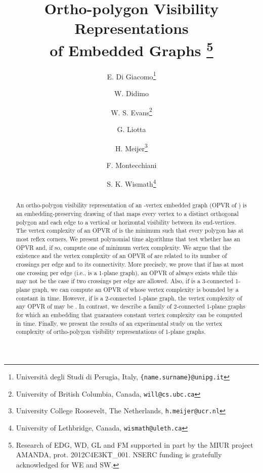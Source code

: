 \documentclass{article}
\newcommand{\opvr}{OPVR\xspace}
\begin{document}
\title{Ortho-polygon Visibility Representations\\of Embedded Graphs
\thanks{Research of EDG, WD, GL and FM  supported in part by the MIUR project AMANDA, prot. 2012C4E3KT\_001. NSERC funding is gratefully acknowledged for WE and SW.}}




\author{E. Di Giacomo\thanks{Universit{\`a} degli Studi di Perugia, Italy, \texttt{\{name.surname\}@unipg.it}} \and W. Didimo\footnotemark[1] \and W. S. Evans\thanks{University of British Columbia, Canada, \texttt{will@cs.ubc.ca}} \and G. Liotta\footnotemark[1] \and H. Meijer\thanks{University College Roosevelt, The Netherlands, \texttt{h.meijer@ucr.nl}} \and F. Montecchiani\footnotemark[1] \and S. K. Wismath\thanks{University of Lethbridge, Canada, \texttt{wismath@uleth.ca}}}

\date{}


\maketitle


\begin{abstract}
An ortho-polygon visibility representation of an -vertex embedded graph  (\opvr of ) is an embedding-preserving drawing of  that maps every vertex  to a distinct orthogonal polygon and each edge to a vertical or horizontal visibility between its end-vertices. The vertex complexity of an \opvr of  is the minimum  such that every polygon has at most  reflex corners. We present polynomial time algorithms that test whether  has an \opvr and, if so, compute one of minimum vertex complexity. We argue that the existence and the vertex complexity of an \opvr of  are related to its number of crossings per edge and to its connectivity. More precisely, we prove that if  has at most one crossing per edge (i.e.,  is a 1-plane graph), an \opvr of  always exists while this may not be the case if two crossings per edge are allowed. Also, if  is a 3-connected 1-plane graph,  we can compute  an  \opvr of  whose vertex complexity is bounded by a constant in  time. However, if  is a 2-connected 1-plane graph, the vertex complexity of any \opvr of   may be . In contrast, we describe a family of 2-connected 1-plane graphs for which an embedding that guarantees constant vertex complexity can be computed in  time. Finally, we present the results of an experimental study on the vertex complexity of ortho-polygon visibility representations of 1-plane graphs.

\end{abstract}
\end{document}

